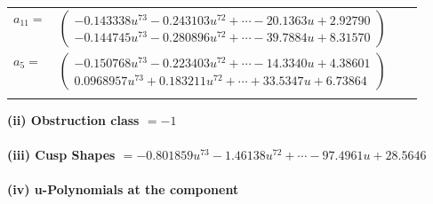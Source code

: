 \documentclass[1p]{elsarticle_modified}
\theoremstyle{definition}
\begin{document}
\begin{tabular}{m{7pt} m{180pt} m{7pt} m{180pt} }
\flushright $a_{11}=$&$\begin{pmatrix}-0.143338 u^{73}-0.243103 u^{72}+\cdots-20.1363 u+2.92790\\-0.144745 u^{73}-0.280896 u^{72}+\cdots-39.7884 u+8.31570\end{pmatrix}$ \\
\flushright $a_{5}=$&$\begin{pmatrix}-0.150768 u^{73}-0.223403 u^{72}+\cdots-14.3340 u+4.38601\\0.0968957 u^{73}+0.183211 u^{72}+\cdots+33.5347 u+6.73864\end{pmatrix}$\\&\end{tabular}
\flushleft \textbf{(ii) Obstruction class $= -1$}\\~\\
\flushleft \textbf{(iii) Cusp Shapes $= -0.801859 u^{73}-1.46138 u^{72}+\cdots-97.4961 u+28.5646$}\\~\\
\newpage\renewcommand{\arraystretch}{1}
\flushleft \textbf{(iv) u-Polynomials at the component}\newline \\
\end{document}
